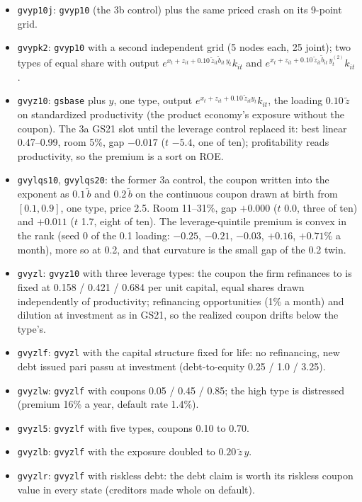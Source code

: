 \documentclass[11pt]{article}
\begin{document}
\begin{itemize}
\item \texttt{gvyp10j}: \texttt{gvyp10} (the 3b control) plus the same priced crash on its 9-point grid.
\item \texttt{gvypk2}: \texttt{gvyp10} with a second independent grid (5 nodes each, 25 joint); two types of equal share with output $e^{x_t+z_{it}+0.10\,\tilde z_{it}\tilde b_{it}\,y_t}k_{it}$ and $e^{x_t+z_{it}+0.10\,\tilde z_{it}\tilde b_{it}\,y^{(2)}_t}k_{it}$.
\item \texttt{gvyz10}: \texttt{gsbase} plus $y$, one type, output $e^{x_t+z_{it}+0.10\,\tilde z_{it} y_t} k_{it}$, the loading $0.10\,\tilde z$ on standardized productivity (the product economy's exposure without the coupon). The 3a GS21 slot until the leverage control replaced it: best linear 0.47--0.99, room 5\%, gap $-0.017$ ($t$ $-5.4$, one of ten); profitability reads productivity, so the premium is a sort on ROE.
\item \texttt{gvylqs10}, \texttt{gvylqs20}: the former 3a control, the coupon written into the exponent as $0.1\,\tilde b$ and $0.2\,\tilde b$ on the continuous coupon drawn at birth from $[0.1, 0.9]$, one type, price 2.5. Room 11--31\%, gap $+0.000$ ($t$ 0.0, three of ten) and $+0.011$ ($t$ 1.7, eight of ten). The leverage-quintile premium is convex in the rank (seed 0 of the 0.1 loading: $-0.25$, $-0.21$, $-0.03$, $+0.16$, $+0.71$\% a month), more so at 0.2, and that curvature is the small gap of the 0.2 twin.
\item \texttt{gvyzl}: \texttt{gvyz10} with three leverage types: the coupon the firm refinances to is fixed at 0.158 / 0.421 / 0.684 per unit capital, equal shares drawn independently of productivity; refinancing opportunities (1\% a month) and dilution at investment as in GS21, so the realized coupon drifts below the type's.
\item \texttt{gvyzlf}: \texttt{gvyzl} with the capital structure fixed for life: no refinancing, new debt issued pari passu at investment (debt-to-equity 0.25 / 1.0 / 3.25).
\item \texttt{gvyzlw}: \texttt{gvyzlf} with coupons 0.05 / 0.45 / 0.85; the high type is distressed (premium 16\% a year, default rate 1.4\%).
\item \texttt{gvyzl5}: \texttt{gvyzlf} with five types, coupons 0.10 to 0.70.
\item \texttt{gvyzlb}: \texttt{gvyzlf} with the exposure doubled to $0.20\,\tilde z\,y$.
\item \texttt{gvyzlr}: \texttt{gvyzlf} with riskless debt: the debt claim is worth its riskless coupon value in every state (creditors made whole on default).

\end{itemize}
\end{document}
